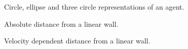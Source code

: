 \documentclass[]{article}
\begin{document}


\begin{figure}[h]
\centering

\caption{Circle, ellipse and three circle representations of an agent.}
\end{figure}

\begin{multicols*}{2}

\end{multicols*}


\newpage


\begin{figure}[h]
\centering

\caption{Absolute distance from a linear wall.}
\end{figure}

\begin{figure}[h]
\centering

\caption{Velocity dependent distance from a linear wall.}
\end{figure}

\begin{multicols*}{2}

\end{multicols*}


\newpage


\begin{multicols*}{2}


\end{multicols*}

\end{document}
